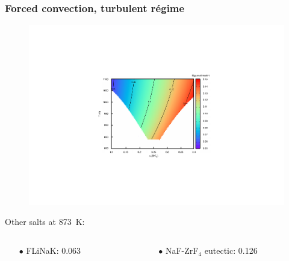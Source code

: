 \documentclass{beamer}
\begin{document}
\begin{frame}
   \frametitle{Forced convection, turbulent r\'egime}
   \begin{figure}
   \includegraphics[width=.6\textwidth]{merit1}
   \end{figure}

  Other salts at 873~K:
    \begin{columns}
      \begin{column}{6cm}
        \begin{itemize}
           \item[$\bullet$] FLiNaK: 0.063
        \end{itemize}
      \end{column}
      \begin{column}{6cm}
        \begin{itemize}
           \item[$\bullet$] NaF-ZrF$_4$ eutectic: 0.126
        \end{itemize}
      \end{column}
   \end{columns}
   
\end{frame}
\end{document}
